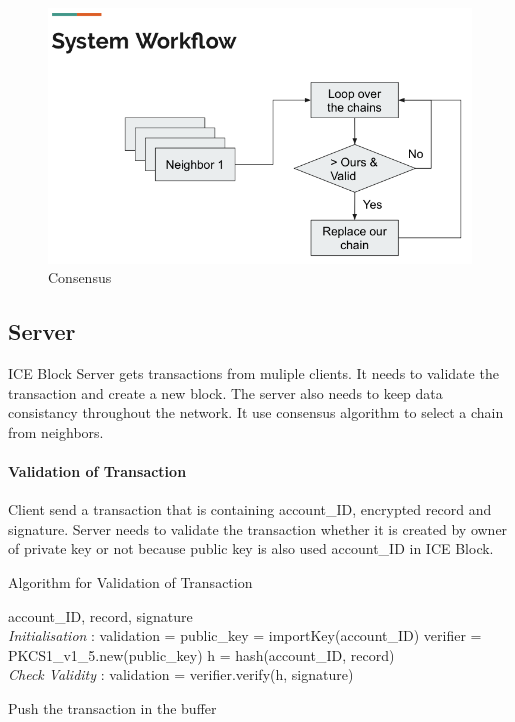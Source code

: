 \documentclass[conference]{IEEEtran}
\begin{document}
\begin{figure}
    \centering
    \includegraphics[scale=0.25]{consensus}
    \caption{Consensus}
    \label{fig:3}
\end{figure}


\subsection{Server}
ICE Block Server gets transactions from muliple clients. It needs to validate the transaction and create a new block.
The server also needs to keep data consistancy throughout the network. It use consensus algorithm to select a chain from neighbors.

\paragraph{Validation of Transaction} 
Client send a transaction that is containing account\_ID, encrypted record and signature.
Server needs to validate the transaction whether it is created by owner of private key or not because public key is also used account\_ID in ICE Block.

\begin{algorithm}
    \caption{Algorithm for Validation of Transaction}
    \begin{algorithmic}[1]
        \renewcommand{\algorithmicrequire}{\textbf{Input:}}
        \renewcommand{\algorithmicensure}{\textbf{Output:}}
        \REQUIRE account\_ID, record, signature
        \\ \textit{Initialisation} :
        \STATE validation = \FALSE
        \STATE public\_key = importKey(account\_ID)
        \STATE verifier = PKCS1\_v1\_5.new(public\_key)
        \STATE h = hash(account\_ID, record)
        \\ \textit{Check Validity} :
        \STATE validation = verifier.verify(h, signature)

            \STATE Push the transaction in the buffer
        \ENDIF

    \end{algorithmic} 
\end{algorithm}
\end{document}
